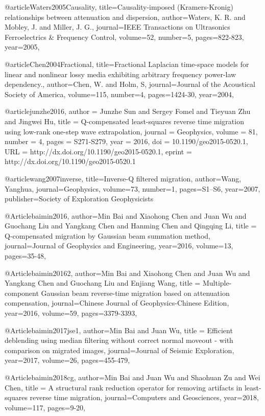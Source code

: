 {@article{Waters2005Causality,
  title={Causality-imposed (Kramers-Kronig) relationships between attenuation and dispersion},
  author={Waters, K. R. and Mobley, J. and Miller, J. G.},
  journal={IEEE Transactions on Ultrasonics Ferroelectrics \& Frequency Control},
  volume={52},
  number={5},
  pages={822-823},
  year={2005},
}

@article{Chen2004Fractional,
  title={Fractional Laplacian time-space models for linear and nonlinear lossy media exhibiting arbitrary frequency power-law dependency.},
  author={Chen, W. and Holm, S},
  journal={Journal of the Acoustical Society of America},
  volume={115},
  number={4},
  pages={1424-30},
  year={2004},
}

@article{junzhe2016,
author = {Junzhe Sun and Sergey Fomel and Tieyuan Zhu and Jingwei Hu},
title = {Q-compensated least-squares reverse time migration using low-rank one-step wave extrapolation},
journal = {Geophysics},
volume = {81},
number = {4},
pages = {S271-S279},
year = {2016},
doi = {10.1190/geo2015-0520.1},
URL = {http://dx.doi.org/10.1190/geo2015-0520.1},
eprint = {http://dx.doi.org/10.1190/geo2015-0520.1}
}

@article{wang2007inverse,
  title={Inverse-{Q} filtered migration},
  author={Wang, Yanghua},
  journal={Geophysics},
  volume={73},
  number={1},
  pages={S1--S6},
  year={2007},
  publisher={Society of Exploration Geophysicists}
}

@Article{baimin2016,
  author={Min Bai and Xiaohong Chen and Juan Wu and Guochang Liu and Yangkang Chen and Hanming Chen and Qingqing Li},
  title = {Q-compensated migration by Gaussian beam summation method},
  journal={Journal of Geophysics and Engineering},
  year=2016,
  volume=13,
  pages={35-48},
}

@Article{baimin20162,
  author={Min Bai and Xiaohong Chen and Juan Wu and Yangkang Chen and Guochang Liu and  Enjiang Wang},
  title = {Multiple-component Gaussian beam reverse-time migration based on attenuation compensation},
  journal={Chinese Journal of Geophysics-Chinese Edition},
  year=2016,
  volume=59,
  pages={3379-3393},
}

@Article{baimin2017jse1,
  author={Min Bai and Juan Wu},
  title = {Efficient deblending using median filtering without correct normal moveout - with comparison on migrated images},
  journal={Journal of Seismic Exploration},
  year=2017,
  volume=26,
  pages={455-479},
}

@Article{baimin2018cg,
  author={Min Bai and Juan Wu and Shaohuan Zu and Wei Chen},
  title = {A structural rank reduction operator for removing artifacts in least-squares reverse time migration},
  journal={Computers and Geosciences},
  year=2018,
  volume=117,
  pages={9-20},
}

}

